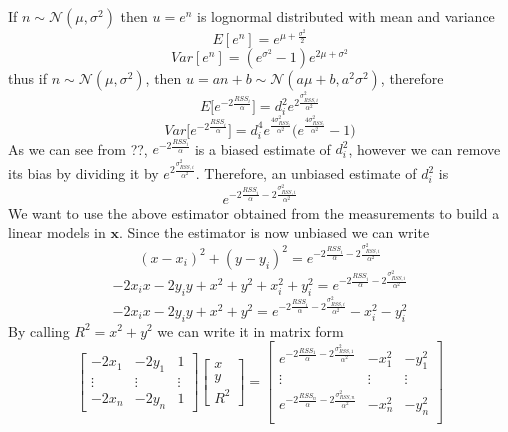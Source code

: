 \documentclass[12pt]{report}
\begin{document}
If $n\sim \mathcal{N}(\mu,\sigma^2)$ then $u=e^n$ is lognormal distributed with mean and variance
\begin{equation}
    E[e^n]=e^{\mu+\frac{\sigma^2}{2}}
\end{equation}
\begin{equation}
Var[e^n]=(e^{\sigma^2}-1)e^{2\mu+\sigma^2}    
\end{equation}
thus
if $n\sim\mathcal{N}(\mu,\sigma^2)$, then $u=an+b\sim \mathcal{N}(a\mu+b,a^2\sigma^2)$, therefore 
\begin{equation}
E\bigg[e^{-2\frac{RSS_i}{\alpha}}\bigg]=d_i^2e^{2\frac{\sigma^2_{RSS,i}}{\alpha^2}}
\end{equation}
\begin{equation}
    Var\bigg[e^{-2\frac{RSS_i}{\alpha}}\bigg]=d_i^4e^{\frac{4\sigma_{RSS_i}^2}{\alpha^2}}\bigg(e^{\frac{4\sigma_{RSS_i}^2}{\alpha^2}}-1\bigg)
\end{equation}
As we can see from ??, $e^{-2\frac{RSS_i}{\alpha}}$ is a biased estimate of $d_i^2$, however we can remove its bias by dividing it by $e^{2\frac{\sigma^2_{RSS,i}}{\alpha^2}}$. Therefore, an unbiased estimate of $d_i^2$ is 
\begin{equation}
    e^{-2\frac{RSS_i}{\alpha}-2\frac{\sigma^2_{RSS,i}}{\alpha^2}}
\end{equation}
We want to use the above estimator obtained from the measurements to build a linear models in $\mathbf{x}$. Since the estimator is now unbiased we can write
\begin{equation}
    (x-x_i)^2+(y-y_i)^2=e^{-2\frac{RSS_i}{\alpha}-2\frac{\sigma^2_{RSS,i}}{\alpha^2}}
\end{equation}
\begin{equation}
    -2x_ix-2y_iy+x^2+y^2+x_i^2+y_i^2=e^{-2\frac{RSS_i}{\alpha}-2\frac{\sigma^2_{RSS,i}}{\alpha^2}}
\end{equation}
\begin{equation}
    -2x_ix-2y_iy+x^2+y^2=e^{-2\frac{RSS_i}{\alpha}-2\frac{\sigma^2_{RSS,i}}{\alpha^2}}-x_i^2-y_i^2
\end{equation}
By calling $R^2=x^2+y^2$ we can write it in matrix form
\begin{equation}
    \begin{bmatrix}
        -2x_1 & -2y_1 & 1\\
        \vdots&\vdots&\vdots\\
        -2x_n & -2y_n & 1
    \end{bmatrix}
    \begin{bmatrix}
        x\\
        y\\
        R^2
    \end{bmatrix} = 
    \begin{bmatrix}
        e^{-2\frac{RSS_1}{\alpha}-2\frac{\sigma^2_{RSS,1}}{\alpha^2}} & -x_1^2 & -y_1^2\\
        \vdots&\vdots&\vdots\\
        e^{-2\frac{RSS_n}{\alpha}-2\frac{\sigma^2_{RSS,n}}{\alpha^2}} & -x_n^2 & -y_n^2\\
    \end{bmatrix}
\end{equation}
\end{document}
